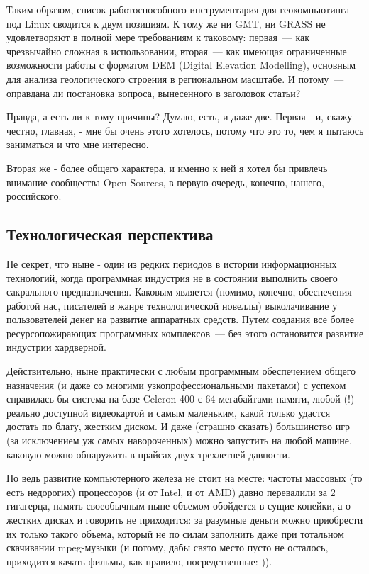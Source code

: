 Таким образом, список работоспособного инструментария для геокомпьютинга под Linux сводится к двум позициям. К тому же ни GMT, ни GRASS не удовлетворяют в полной мере требованиям к таковому: первая~--- как чрезвычайно сложная в использовании, вторая~--- как имеющая ограниченные возможности работы с форматом DEM (Digital Elevation Modelling), основным для анализа геологического строения в региональном масштабе. И потому~--- оправдана ли постановка вопроса, вынесенного в заголовок статьи?

Правда, а есть ли к тому причины? Думаю, есть, и даже две. Первая - и, скажу честно, главная, - мне бы очень этого хотелось, потому что это то, чем я пытаюсь заниматься и что мне интересно.

Вторая же - более общего характера, и именно к ней я хотел бы привлечь внимание сообщества Open Sources, в первую очередь, конечно, нашего, российского.

\subsection{Технологическая перспектива}

Не секрет, что ныне - один из редких периодов в истории информационных технологий, когда программная индустрия не в состоянии выполнить своего сакрального предназначения. Каковым является (помимо, конечно, обеспечения работой нас, писателей в жанре технологической новеллы) выколачивание у пользователей денег на развитие аппаратных средств. Путем создания все более ресурсопожирающих программных комплексов~--- без этого остановится развитие индустрии хардверной.

Действительно, ныне практически с любым программным обеспечением общего назначения (и даже со многими узкопрофессиональными пакетами) с успехом справилась бы система на базе Celeron-400 с 64 мегабайтами памяти, любой (!) реально доступной видеокартой и самым маленьким, какой только удастся достать по блату, жестким диском. И даже (страшно сказать) большинство игр (за исключением уж самых навороченных) можно запустить на любой машине, каковую можно обнаружить в прайсах двух-трехлетней давности.

Но ведь развитие компьютерного железа не стоит на месте: частоты массовых (то есть недорогих) процессоров (и от Intel, и от AMD) давно перевалили за 2 гигагерца, память своеобычным ныне объемом обойдется в сущие копейки, а о жестких дисках и говорить не приходится: за разумные деньги можно приобрести их только такого объема, который не по силам заполнить даже при тотальном скачивании mpeg-музыки (и потому, дабы свято место пусто не осталось, приходится качать фильмы, как правило, посредственные:-)).

